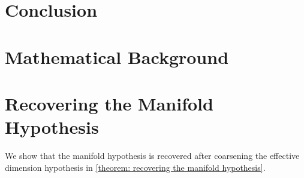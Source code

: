 \documentclass{article}
\begin{document}
\section{Conclusion}



\newpage





\newpage
\appendix

\section{Mathematical Background}

\newpage

\section{Recovering the Manifold Hypothesis}
We show that the manifold hypothesis is recovered after coarsening the effective dimension hypothesis in \cref{theorem: recovering the manifold hypothesis}.

\recoveringmanifoldhypothesis
\end{document}
